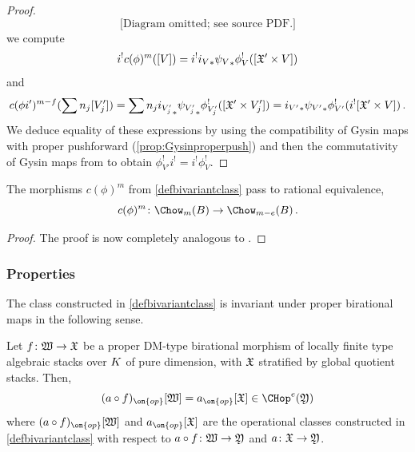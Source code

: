 \begin{proof}
\begin{equation}
\text{[Diagram omitted; see source PDF.]}
\end{equation}
we compute
\[i^! c(\phi)^m ([V]) = i^! {i_V}_* {\psi_V}_* \phi_V^! ( [\frak X' \times V]) \]
and
\[c(\phi i')^{m-f}(\sum n_j [V'_j]) = \sum n_j  {i_{V'_j}}_* {\psi_{V'_j}}_* \phi_{V'_j}^! ( [\frak X' \times V'_j]) =  {i_{V'}}_* {\psi_{V'}}_* \phi_{V'}^! ( i^![\frak X' \times V])\, . \]
We deduce equality of these expressions by using the compatibility of Gysin maps with proper pushforward (\cref{prop:Gysinproperpush}) and then the commutativity of Gysin maps from \cite{Kresch1999Cycle-groups-fo} to obtain $\phi_{V'}^!  i^! = i^! \phi_V^!$.
\end{proof}

\begin{lemma}
\notready\label{lem:ratequiv}
The morphisms $c(\phi)^{m}$ from \cref{defbivariantclass} pass to rational equivalence,
\[c(\phi)^{m}\colon \Chow_m(B) \to \Chow_{m-e}(B)\, .\]
\end{lemma}

\begin{proof}
The proof is now completely analogous to \cite[Theorem 17.1]{Fulton1984Intersection-th}. %
\end{proof}

\subsubsection{Properties}
The class constructed in \cref{defbivariantclass} is invariant under proper birational maps in the following sense.
\begin{proposition}
\notready\label{prop:invarianceproperbirat}
Let $f\colon \frak W \to \frak X$ be a proper DM-type birational morphism of locally finite type algebraic stacks over ${K}$ of pure dimension, with $\frak X$ stratified by global quotient stacks. Then,
\[(a\circ f)_{\on{op}}[\frak W] = a_{\on{op}}[\frak X] \in \CHop^e(\frak Y)\]
where $(a\circ f)_{\on{op}}[\frak W]$ and $a_{\on{op}}[\frak X]$ are the operational classes constructed in \cref{defbivariantclass} with respect to $a\circ f\colon \frak W \to \frak Y$ and $a\colon \frak X \to \frak Y$.
\end{proposition}

